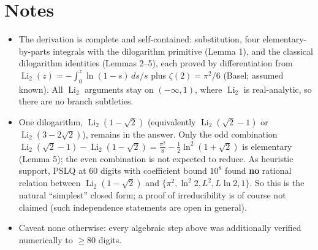\documentclass[11pt]{article}
\theoremstyle{remark}
\begin{document}
\section*{Notes}

\begin{itemize}
\item The derivation is complete and self-contained: substitution, four elementary-by-parts integrals with the dilogarithm primitive (Lemma 1), and the classical dilogarithm identities (Lemmas 2--5), each proved by differentiation from $\operatorname{Li}_2(z)=-\int_0^z\ln(1-s)\,ds/s$ plus $\zeta(2)=\pi^2/6$ (Basel; assumed known). All $\operatorname{Li}_2$ arguments stay on $(-\infty,1)$, where $\operatorname{Li}_2$ is real-analytic, so there are no branch subtleties.
\item One dilogarithm, $\operatorname{Li}_2(1-\sqrt2)$ (equivalently $\operatorname{Li}_2(\sqrt2-1)$ or $\operatorname{Li}_2(3-2\sqrt2)$), remains in the answer. Only the odd combination $\operatorname{Li}_2(\sqrt2-1)-\operatorname{Li}_2(1-\sqrt2)=\tfrac{\pi^2}{8}-\tfrac12\ln^2(1+\sqrt2)$ is elementary (Lemma 5); the even combination is not expected to reduce. As heuristic support, PSLQ at 60 digits with coefficient bound $10^{8}$ found \textbf{no} rational relation between $\operatorname{Li}_2(1-\sqrt2)$ and $\{\pi^2,\ln^2 2,L^2,L\ln 2,1\}$. So this is the natural ``simplest'' closed form; a proof of irreducibility is of course not claimed (such independence statements are open in general).
\item Caveat none otherwise: every algebraic step above was additionally verified numerically to $\ge 80$ digits.
\end{itemize}
\end{document}
